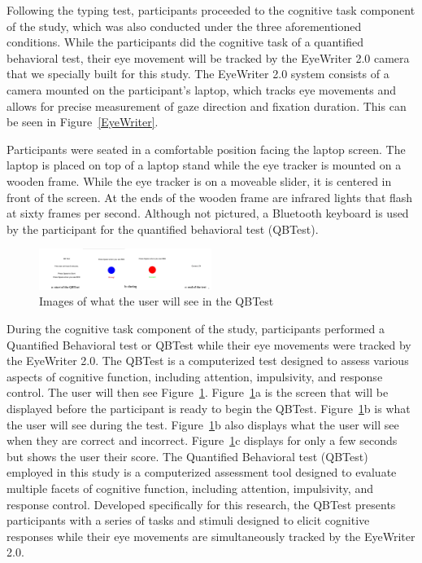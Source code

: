 \documentclass[manuscript, screen, review]{acmart} %
\begin{document}
Following the typing test, participants proceeded to the cognitive task component of the study, which was also conducted under the three aforementioned conditions. 
While the participants did the cognitive task of a quantified behavioral test, their eye movement will be tracked by the EyeWriter 2.0 camera that we specially built for this study. 
The EyeWriter 2.0 system consists of a camera mounted on the participant's laptop, which tracks eye movements and allows for precise measurement of gaze direction and fixation duration. This can be seen in Figure~\ref{EyeWriter}.

Participants were seated in a comfortable position facing the laptop screen.
The laptop is placed on top of a laptop stand while the eye tracker is mounted on a wooden frame. 
While the eye tracker is on a moveable slider, it is centered in front of the screen. 
At the ends of the wooden frame are infrared lights that flash at sixty frames per second. %
Although not pictured, a Bluetooth keyboard is used by the participant for the quantified behavioral test (QBTest).

\begin{figure}
  \includegraphics[width=0.5\textwidth]{qbTest.png}
  \caption{Images of what the user will see in the QBTest}
  \label{QBTest}
\end{figure}

During the cognitive task component of the study, participants performed a Quantified Behavioral test or QBTest while their eye movements were tracked by the EyeWriter 2.0.
The QBTest is a computerized test designed to assess various aspects of cognitive function, including attention, impulsivity, and response control.
The user will then see Figure~\ref{QBTest}. Figure~\ref{QBTest}a is the screen that will be displayed before the participant is ready to begin the QBTest.
Figure~\ref{QBTest}b is what the user will see during the test. Figure~\ref{QBTest}b also displays what the user will see when they are correct and incorrect.
Figure~\ref{QBTest}c displays for only a few seconds but shows the user their score.
The Quantified Behavioral test (QBTest) employed in this study is a computerized assessment tool designed to evaluate multiple facets of cognitive function, including attention, impulsivity, and response control. Developed specifically for this research, the QBTest presents participants with a series of tasks and stimuli designed to elicit cognitive responses while their eye movements are simultaneously tracked by the EyeWriter 2.0.
\end{document}
